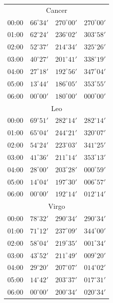 \begin{table}[!h]
\begin{Parallel}{}{}
{{\begin{tabular}{l|lll}
\multicolumn{4}{c}{Cancer}\\
00:00 & $66^\circ 34'$ & $270^\circ 00'$ & $270^\circ 00'$\\
01:00 & $62^\circ 24'$ & $236^\circ 02'$ & $303^\circ 58'$\\
02:00 & $52^\circ 37'$ & $214^\circ 34'$ & $325^\circ 26'$\\
03:00 & $40^\circ 27'$ & $201^\circ 41'$ & $338^\circ 19'$\\
04:00 & $27^\circ 18'$ & $192^\circ 56'$ & $347^\circ 04'$\\
05:00 & $13^\circ 44'$ & $186^\circ 05'$ & $353^\circ 55'$\\
06:00 & $00^\circ 00'$ & $180^\circ 00'$ & $000^\circ 00'$\\
\multicolumn{4}{c}{Leo}\\
00:00 & $69^\circ 51'$ & $282^\circ 14'$ & $282^\circ 14'$\\
01:00 & $65^\circ 04'$ & $244^\circ 21'$ & $320^\circ 07'$\\
02:00 & $54^\circ 24'$ & $223^\circ 03'$ & $341^\circ 25'$\\
03:00 & $41^\circ 36'$ & $211^\circ 14'$ & $353^\circ 13'$\\
04:00 & $28^\circ 00'$ & $203^\circ 28'$ & $000^\circ 59'$\\
05:00 & $14^\circ 04'$ & $197^\circ 30'$ & $006^\circ 57'$\\
06:00 & $00^\circ 00'$ & $192^\circ 14'$ & $012^\circ 14'$\\
\multicolumn{4}{c}{Virgo}\\
00:00 & $78^\circ 32'$ & $290^\circ 34'$ & $290^\circ 34'$\\
01:00 & $71^\circ 12'$ & $237^\circ 09'$ & $344^\circ 00'$\\
02:00 & $58^\circ 04'$ & $219^\circ 35'$ & $001^\circ 34'$\\
03:00 & $43^\circ 52'$ & $211^\circ 49'$ & $009^\circ 20'$\\
04:00 & $29^\circ 20'$ & $207^\circ 07'$ & $014^\circ 02'$\\
05:00 & $14^\circ 42'$ & $203^\circ 37'$ & $017^\circ 31'$\\
06:00 & $00^\circ 00'$ & $200^\circ 34'$ & $020^\circ 34'$\\
\end{tabular}
}}
\end{Parallel}
\end{table}
